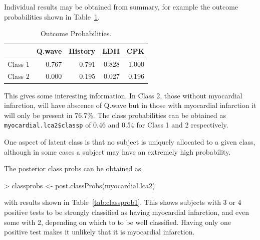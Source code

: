 Individual results may be obtained from summary, for example the outcome probabilities shown in Table~\ref{tab:outcomep1}.
\begin{Schunk}
\end{Schunk}



\begin{table}[ht]
\centering
\begin{tabular}{rrrrr}
  \hline
 & Q.wave & History & LDH & CPK \\ 
  \hline
Class  1 & 0.767 & 0.791 & 0.828 & 1.000 \\ 
  Class  2 & 0.000 & 0.195 & 0.027 & 0.196 \\ 
   \hline
\end{tabular}
\caption{Outcome Probabilities.} 
\label{tab:outcomep1}
\end{table}


This gives some interesting information. In Class 2, those without myocardial infarction, will have abscence of Q.wave but in those with myocardial infarction it will only be present in 76.7\%. The class probabilities can be obtained as \texttt{myocardial.lca2\$classp} of 0.46 and 0.54 for Class 1 and 2 respectively.


One aspect of latent class is that no subject is uniquely allocated to a given class, although in some cases a subject may have an extremely high probability.

The posterior class probs can be obtained as

\begin{Schunk}
\begin{Sinput}
> classprobs <- post.classProbs(myocardial.lca2)
\end{Sinput}
\end{Schunk}

with results shown in Table~\ref{tab:classprob1}. This shows subjects with 3 or 4 positive tests to be strongly classified as having myocardial infarction, and even some with 2, depending on which to to be well classified. Having only one positive test makes it unlikely that it is myocardial infarction.



